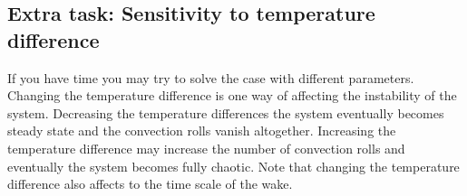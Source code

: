 \subsection*{Extra task: Sensitivity to temperature difference}

If you have time you may try to solve the case with different parameters. Changing the temperature difference
is one way of affecting the instability of the system. Decreasing the temperature differences the system eventually becomes 
steady state and the convection rolls vanish altogether. Increasing the temperature difference may increase the 
number of convection rolls and eventually the system becomes fully chaotic. Note that changing the temperature difference also affects to the time scale of the wake. 

\hfill
